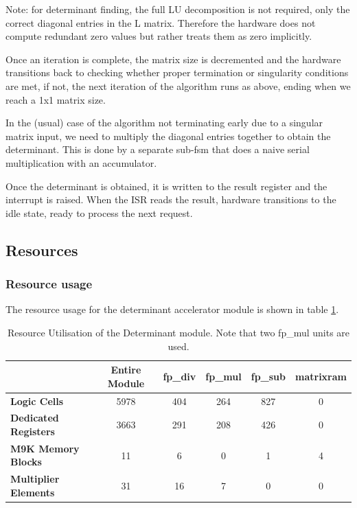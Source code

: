 \documentclass[]{article}
\begin{document}
Note: for determinant finding, the full LU decomposition is not required, only the correct diagonal entries in the L matrix. Therefore the hardware does not compute redundant zero values but rather treats them as zero implicitly.

Once an iteration is complete, the matrix size is decremented and the hardware transitions back to checking whether proper termination or singularity conditions are met, if not, the next iteration of the algorithm runs as above, ending when we reach a 1x1 matrix size.

In the (usual) case of the algorithm not terminating early due to a singular matrix input, we need to multiply the diagonal entries together to obtain the determinant. This is done by a separate sub-fsm that does a naive serial multiplication with an accumulator. 

Once the determinant is obtained, it is written to the result register and the interrupt is raised. When the ISR reads the result, hardware transitions to the idle state, ready to process the next request.

\subsection{Resources} %
\label{sub:resources}

\subsubsection{Resource usage} %
\label{sub:resource_usage}

The resource usage for the determinant accelerator module is shown in table \ref{tab:resource_util_det}.

\begin{table}[htbp]
	\caption{Resource Utilisation of the Determinant module. Note that two fp\_mul units are used.}
	\label{tab:resource_util_det}
	\begin{center}
		\begin{tabular}{l|ccccc}
		\hline

		\hline
											& \textbf{Entire Module} 	& \textbf{fp\_div} 		& \textbf{fp\_mul}	& \textbf{fp\_sub} 	& \textbf{matrixram} \\
		\hline
			\textbf{Logic Cells} 			& 5978						& 404 					& 264 				& 827 				& 0 \\
			\textbf{Dedicated Registers}	& 3663						& 291 					& 208 				& 426				& 0 \\
			\textbf{M9K Memory Blocks}		& 11						& 6 					& 0 				& 1 				& 4 \\
			\textbf{Multiplier Elements}	& 31						& 16 					& 7 				& 0					& 0 \\
		\hline

		\hline
		\end{tabular}
	\end{center}
\end{table}
\end{document}
